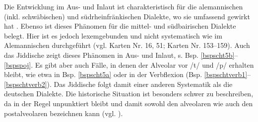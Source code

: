 

Die Entwicklung im Aus- und Inlaut ist charakteristisch für die alemannischen (inkl. schwäbischen) und südrheinfränkischen Dialekte, wo sie umfassend gewirkt hat \parencite[361]{Schirmunski1962}. Ebenso ist dieses Phänomen für die mittel- und südbairischen Dialekte belegt. Hier ist es jedoch lexemgebunden und nicht systematisch wie im Alemannischen durchgeführt (vgl.  Karten Nr. 16, 51;   Karten Nr. 153–159). Auch das Jiddische zeigt dieses Phänomen in Aus- und Inlaut, s. Bsp. \ref{bspscht5b}–\ref{bspspoj}. Es gibt aber auch Fälle, in denen der Alveolar vor /t/ und /p/ erhalten bleibt, wie etwa in Bsp. \ref{bspscht5a} oder in der Verbflexion (Bsp. \ref{bspschtverb1}–\ref{bspschtverb2}). Das Jiddische folgt damit einer anderen Systematik als die deutschen Dialekte. Die historische Situation ist besonders schwer zu beschreiben, da  in der Regel unpunktiert bleibt und damit sowohl den alveolaren wie auch den postalveolaren  bezeichnen kann (vgl. \cite[153, 272]{Timm1987}). 

